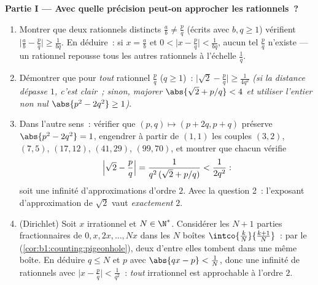 \begin{problem}
\medskip
\noindent\textbf{Partie I --- Avec quelle précision peut-on approcher les
rationnels~?}
\begin{enumerate}
  \item Montrer que deux rationnels distincts $\frac ab \neq \frac pq$
        (écrits avec $b, q \geq 1$) vérifient $\bigl|\frac ab -
        \frac pq\bigr| \geq \frac{1}{bq}$. En déduire~: si $x =
        \frac ab$ et $0 < \bigl|x - \frac pq\bigr| <
        \frac{1}{bq}$, aucun tel $\frac pq$ n'existe --- un rationnel
        repousse tous les autres rationnels à l'échelle $\frac 1q$.
  \item Démontrer que pour \emph{tout} rationnel $\frac pq$ ($q \geq
        1$)~: $\bigl|\sqrt2 - \frac pq\bigr| \geq
        \frac{1}{4q^2}$ \emph{(si la distance dépasse $1$, c'est
        clair~; sinon, majorer $\abs{\sqrt2 + p/q} < 4$ et
        utiliser l'entier non nul $\abs{p^2 - 2q^2} \geq 1$)}.
  \item Dans l'autre sens~: vérifier que $(p, q) \mapsto (p +
        2q, p + q)$ préserve $\abs{p^2 - 2q^2} = 1$, engendrer
        à partir de $(1,1)$ les couples $(3,2)$, $(7,5)$, $(17,12)$,
        $(41,29)$, $(99,70)$, et montrer que chacun vérifie
        \[
        \Bigl|\sqrt2 - \frac pq\Bigr| =
        \frac{1}{q^2\,(\sqrt2 + p/q)} < \frac{1}{2q^2} :
        \]
        soit une infinité d'approximations d'ordre $2$. Avec
        la question 2~: l'exposant d'approximation de $\sqrt 2$ vaut
        \emph{exactement} $2$.
  \item (Dirichlet) Soit $x$ irrationnel et $N \in \N^*$.
        Considérer les $N + 1$ parties fractionnaires de $0, x, 2x,
        \dots, Nx$ dans les $N$ boîtes $\intco{\frac kN}{\frac{k +
        1}{N}}$~: par le 
        (\cref{cor:b1:counting:pigeonhole}), deux d'entre elles tombent
        dans une même boîte. En déduire $q \leq N$ et $p$ avec $\abs{qx - p} <
        \frac 1N$, donc une infinité de rationnels avec
        $\bigl|x - \frac pq\bigr| < \frac{1}{q^2}$~: \emph{tout}
        irrationnel est approchable à l'ordre $2$.
\end{enumerate}


\end{problem}
